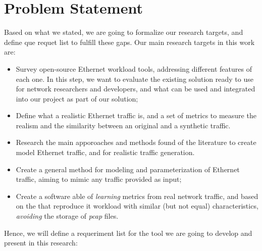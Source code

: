 \section{Problem Statement}


Based on what we stated,  we are going to formalize our research targets, and define que requet list to fulfill these gaps. Our main research targets in this work are:

\begin{itemize}
	
	\item Survey open-source Ethernet workload tools, addressing different features of each one. In this step, we want to evaluate the existing solution ready to use for network researchers and developers, and what can be used and integrated into our project as part of our solution;
	
	\item Define what a realistic Ethernet traffic is, and a set of metrics to measure the realism and the similarity between an original and a synthetic traffic.
	
	\item Research the main apporoaches and methods found of the literature to create model Ethernet traffic, and for realistic traffic generation. 
	
	\item Create a general method for modeling and parameterization of Ethernet traffic, aiming to mimic any traffic provided as input;
	
	\item Create a software able of \textit{learning} metrics from real network traffic, and based on the that reproduce it workload with similar (but not equal) characteristics, \textit{avoiding} the storage of \textit{pcap} files.
	
\end{itemize}

Hence, we will define a requeriment list for the tool we are going to develop and present in this research:

